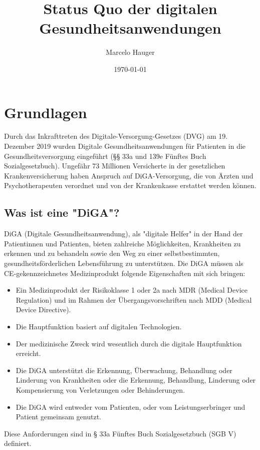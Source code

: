 \documentclass{article}
\title{Status Quo der digitalen Gesundheitsanwendungen}
\author{Marcelo Hauger}
\date{\today}
\begin{document}
	\maketitle
	\newpage
	\tableofcontents
	\newpage
	\section{Grundlagen}
		Durch das Inkrafttreten des Digitale-Versorgung-Gesetzes (DVG) am 19. Dezember 2019 wurden Digitale Gesundheitsanwendungen für Patienten in die Gesundheitsversorgung eingeführt (§§ 33a und 139e Fünftes Buch Sozialgesetzbuch). Ungefähr 73 Millionen Versicherte in der gesetzlichen Krankenversicherung haben Anspruch auf DiGA-Versorgung, die von Ärzten und Psychotherapeuten verordnet und von der Krankenkasse erstattet werden können.
		\subsection{Was ist eine "DiGA"?}
			DiGA (Digitale Gesundheitsanwendung), als "digitale Helfer" in der Hand der Patientinnen und Patienten, bieten zahlreiche Möglichkeiten, Krankheiten zu erkennen und zu behandeln sowie den Weg zu einer selbstbestimmten, gesundheitsförderlichen Lebensführung zu unterstützen. Die DiGA müssen als CE-gekennzeichnetes Medizinprodukt folgende Eigenschaften mit sich bringen:
			\begin{itemize}
				\item Ein Medizinprodukt der Risikoklasse 1 oder 2a nach MDR (Medical Device Regulation) und im Rahmen der Übergangsvorschriften nach MDD (Medical Device Directive).
				\item Die Hauptfunktion basiert auf digitalen Technologien.
				\item Der medizinische Zweck wird wesentlich durch die digitale Hauptfunktion erreicht.
				\item Die DiGA unterstützt die Erkennung, Überwachung, Behandlung oder Linderung von Krankheiten oder die Erkennung, Behandlung, Linderung oder Kompensierung von Verletzungen oder Behinderungen.
				\item Die DiGA wird entweder vom Patienten, oder vom Leistungserbringer und Patient gemeinsam genutzt.
			\end{itemize}  
			Diese Anforderungen sind in § 33a Fünftes Buch Sozialgesetzbuch (SGB V) definiert.\cite[vgl. Was ist eine DiGA?]{wissenswertes-diga}
		\newpage
\end{document}
